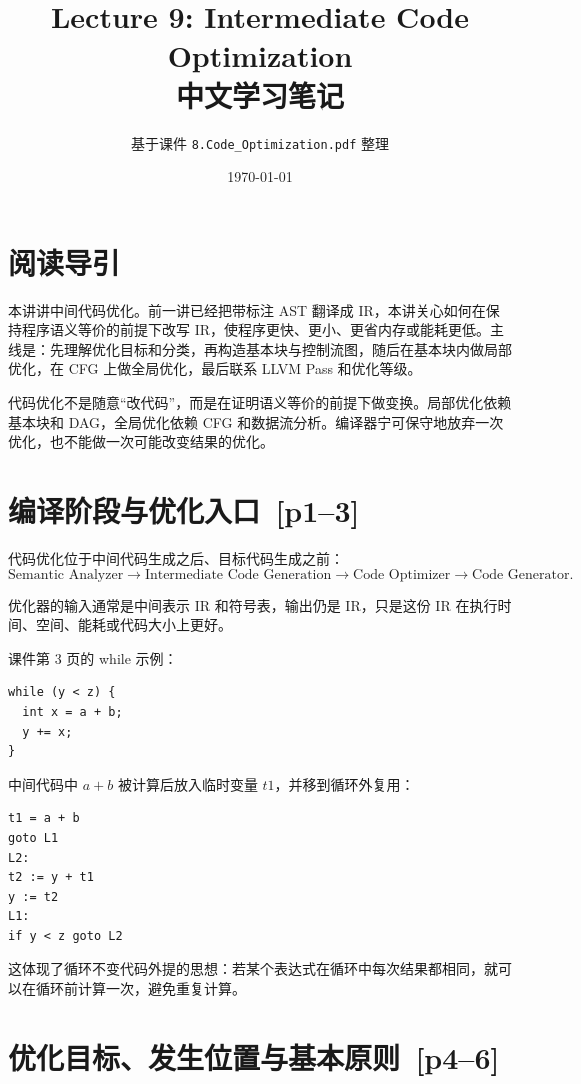 \documentclass[UTF8,fontset=none,11pt]{ctexart}
\title{\bfseries Lecture 9: Intermediate Code Optimization\\中文学习笔记}
\author{基于课件 \texttt{8.Code\_Optimization.pdf} 整理}
\date{\today}
\newenvironment{notebox}[1][]{%
  \par\medskip\noindent{\color{noterule}\rule{\linewidth}{1.1pt}}\par\nopagebreak
  \noindent{\bfseries\color{noterule}#1}\par\nopagebreak\smallskip}%
  {\par\nopagebreak\smallskip\noindent{\color{noterule}\rule{\linewidth}{0.4pt}}\par\medskip}
\newcommand{\pg}[1]{\texorpdfstring{{\small\color{graytext}\,[p#1]}}{ [p#1]}}
\begin{document}
\maketitle
\tableofcontents
\newpage

\section*{阅读导引}

本讲讲中间代码优化。前一讲已经把带标注 AST 翻译成 IR，本讲关心如何在保持程序语义等价的前提下改写 IR，使程序更快、更小、更省内存或能耗更低。主线是：先理解优化目标和分类，再构造基本块与控制流图，随后在基本块内做局部优化，在 CFG 上做全局优化，最后联系 LLVM Pass 和优化等级。

\begin{notebox}[本讲主线]
代码优化不是随意“改代码”，而是在证明语义等价的前提下做变换。局部优化依赖基本块和 DAG，全局优化依赖 CFG 和数据流分析。编译器宁可保守地放弃一次优化，也不能做一次可能改变结果的优化。
\end{notebox}

\section{编译阶段与优化入口 \pg{1--3}}

代码优化位于中间代码生成之后、目标代码生成之前：
\[
\text{Semantic Analyzer}\to \text{Intermediate Code Generation}\to \text{Code Optimizer}\to \text{Code Generator}.
\]

优化器的输入通常是中间表示 IR 和符号表，输出仍是 IR，只是这份 IR 在执行时间、空间、能耗或代码大小上更好。

课件第 3 页的 while 示例：

\begin{verbatim}
while (y < z) {
  int x = a + b;
  y += x;
}
\end{verbatim}

中间代码中 \(a+b\) 被计算后放入临时变量 \(t1\)，并移到循环外复用：

\begin{verbatim}
t1 = a + b
goto L1
L2:
t2 := y + t1
y := t2
L1:
if y < z goto L2
\end{verbatim}

这体现了循环不变代码外提的思想：若某个表达式在循环中每次结果都相同，就可以在循环前计算一次，避免重复计算。

\section{优化目标、发生位置与基本原则 \pg{4--6}}
\end{document}
